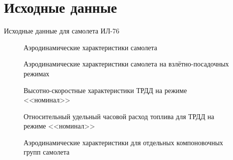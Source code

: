 \chapter{Исходные данные}

\begin{table}[H]
    \centering
    \caption{Исходные данные для самолета ИЛ-76}
    \label{tab:variant_data}
    
\end{table}

\begin{figure}[H]
\centering
\resizebox{.79\linewidth}{!}{}
\caption{Аэродинамические характеристики самолета}
\label{fig:aero_data}
\end{figure}
\begin{figure}[H]
\centering
\resizebox{.79\linewidth}{!}{}
\caption{Аэродинамические характеристики самолета на взлётно-посадочных режимах}
\label{fig:aero_data_landing}
\end{figure}
\begin{figure}[H]
\centering
\resizebox{.79\linewidth}{!}{}
\caption{Высотно-скоростные характеристики ТРДД на режиме <<номинал>>}
\label{fig:tilda_P_data}
\end{figure}
\begin{figure}[H]
\centering
\resizebox{.79\linewidth}{!}{}
\caption{Относительный удельный часовой расход топлива для ТРДД на режиме <<номинал>>}
\label{fig:tilda_Ce_data}
\end{figure}
\begin{figure}[H]
\centering
\resizebox{.79\linewidth}{!}{}
\caption{Аэродинамические характеристики для отдельных компоновочных групп самолета}
\label{fig:aero_data_elements}
\end{figure}
